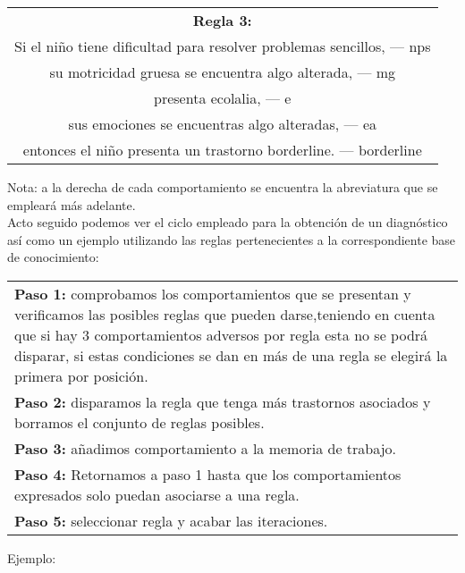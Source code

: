 \documentclass[letterpaper,12pt]{article}
\begin{document}
\begin{center}
\begin{tabular}{|c|}
\hline 
\textbf{Regla 3:} \\
Si el niño tiene dificultad para resolver problemas sencillos, — nps\\
su motricidad gruesa se encuentra algo alterada, — mg\\
presenta ecolalia, — e\\
sus emociones se encuentras algo alteradas, — ea\\
entonces el niño presenta un trastorno borderline. — borderline \\ 
\hline 
\end{tabular} 
\end{center}

Nota: a la derecha de cada comportamiento se encuentra la abreviatura que
se empleará más adelante. \\

Acto seguido podemos ver el ciclo empleado para la obtención de un
diagnóstico así como un ejemplo utilizando las reglas pertenecientes a la correspondiente base de conocimiento: \\

\begin{center}
\begin{tabular}{|p{15cm}|}
\hline 
\textbf{Paso 1:} comprobamos los comportamientos que se presentan y verificamos las posibles reglas que pueden darse,teniendo en cuenta que si hay 3 comportamientos adversos por regla esta no se podrá disparar, si estas condiciones se dan en más de una regla se elegirá la primera por posición. \\
\textbf{Paso 2:} disparamos la regla que tenga más trastornos asociados y borramos el conjunto de reglas posibles.\\
\textbf{Paso 3:} añadimos comportamiento a la memoria de trabajo. \\
\textbf{Paso 4:} Retornamos a paso 1 hasta que los comportamientos expresados solo puedan asociarse a una regla.\\
\textbf{Paso 5:} seleccionar regla y acabar las iteraciones. \\ 
\hline 
\end{tabular} 
\end{center}
\newpage
Ejemplo: \\
\end{document}
